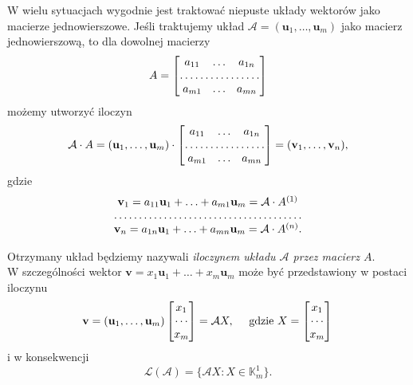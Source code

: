  	\begin{uwg}
 		 	W wielu sytuacjach wygodnie jest traktować niepuste układy wektorów jako macierze jednowierszowe. Jeśli traktujemy układ $\mathcal{A} = (\textbf{u}_1, \ldots, \textbf{u}_m)$ jako macierz jednowierszową, to dla dowolnej macierzy 
 		 	\begin{equation*}
 		 		A = \begin{bmatrix}
 		 		\; a_{11} & \ldots & a_{1n} \; \\
 		 		\hdotsfor{3}  \\
 		 		\; a_{m1} & \ldots & a_{mn} \; \\
 		 		\end{bmatrix}
 		 	\end{equation*}
 	możemy utworzyć iloczyn 
 	\begin{equation*}
 		\mathcal{A} \cdot A = 
	 		(\textbf{u}_1, \ldots, \textbf{u}_m) \cdot
	 		\begin{bmatrix}
	 		\; a_{11} & \ldots & a_{1n} \; \\
	 		\hdotsfor{3}  \\
	 		\; a_{m1} & \ldots & a_{mn} \; \\
	 		\end{bmatrix} 
	 		= (\textbf{v}_1, \ldots, \textbf{v}_n),	 		
 	\end{equation*}
 	gdzie
 	\begin{equation*}
	 	\begin{matrix}
		 	\textbf{v}_1  = a_{11}\textbf{u}_1 + \ldots + a_{m1}\textbf{u}_m  = \mathcal{A} \cdot A^{(1)} \\
		 	\hdotsfor{1} \\
		 	\textbf{v}_n  = a_{1n}\textbf{u}_1 + \ldots + a_{mn}\textbf{u}_m   = \mathcal{A} \cdot A^{(n)}.
	 	\end{matrix}
 	\end{equation*}

	Otrzymany układ będziemy nazywali \textit{iloczynem układu $\mathcal{A}$ przez macierz $A$}. \\
	W szczególności wektor $\textbf{v} = x_1\textbf{u}_1 + \ldots + x_m\textbf{u}_m$ może być przedstawiony w postaci iloczynu
	\begin{equation*}
		\textbf{v} = (\textbf{u}_1, \ldots, \textbf{u}_m) \begin{bmatrix} x_1 \\ \cdots \\ x_m \end{bmatrix} = \mathcal{A}X,
		\quad \text{ gdzie }  X = \begin{bmatrix} x_1 \\ \cdots \\ x_m \end{bmatrix}\\
	\end{equation*}
	i w konsekwencji 
	\begin{equation*}
		\mathcal{L}(\mathcal{A}) = \{\mathcal{A}X: X \in \mathbb{K}^1_{m} \}.
	\end{equation*}
 	\end{uwg}

